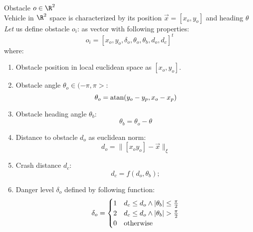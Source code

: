 \begin{definition}{Obstacle $o \in \R^2$}\label{def:2dobst}
\\Vehicle in $\R^2$ space is characterized by its position $\vec{x} = [x_o, y_o]$ and heading $\theta$ \textit{Let} us define obstacle $o_i$: as vector with following properties: 
\begin{equation}
o_i = [x_o , y_o, \delta_o, \theta_o, \theta_b,d_o, d_c ]^t
\end{equation}
where:
\begin{enumerate}
    \item Obstacle position in local euclidean space as $[x_o, y_o]$.
    \item Obstacle angle $\theta_o \in (-\pi,\pi>$:
    \begin{equation}
        \theta_o = \textnormal{atan} (y_o - y_p,x_o - x_p)
    \end{equation}
    
    \item Obstacle heading angle $\theta_b$:
    \begin{equation}\label{eq:obstacleHeadingAngle}
        \theta_b = \theta_o - \theta
    \end{equation}
    
    \item Distance to obstacle $d_o$ as euclidean norm:
    \begin{equation}
        d_o = \lVert [x_o y_o] - \vec{x} \rVert_{\xi}
    \end{equation}
    
    \item Crash distance $d_c$:
    \begin{equation}\label{eq:crashdistance}
        d_c = f(d_o,\theta_b);
    \end{equation}
    
    \item Danger level $\delta_o$ defined by following function:
    \begin{equation}
    \delta_o =
    \begin{cases}
        1 & d_c \leq d_o \wedge |\theta_b| \le \frac{\pi}{2}\\
        2 & d_c \leq d_o \wedge |\theta_b| > \frac{\pi}{2}\\
        0 & \textnormal{otherwise}
    \end{cases}
    \end{equation}
\end{enumerate}
\end{definition}

